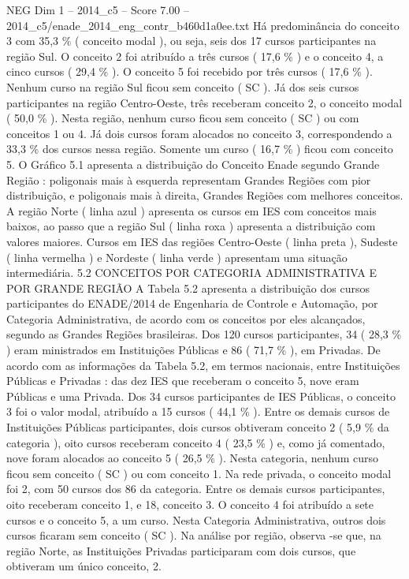 \begin{textsample}{NEG Dim 1 – 2014\_c5 – Score 7.00 – 2014\_c5/enade\_2014\_eng\_contr\_b460d1a0ee.txt}
Há predominância do conceito 3 com 35,3 \% ( conceito modal ), ou seja, seis dos 17 cursos participantes na região Sul.
O conceito 2 foi atribuído a três cursos ( 17,6 \% ) e o conceito 4, a cinco cursos ( 29,4 \% ).
O conceito 5 foi recebido por três cursos ( 17,6 \% ).
Nenhum curso na região Sul ficou sem conceito ( SC ).
Já dos seis cursos participantes na região Centro-Oeste, três receberam conceito 2, o conceito modal ( 50,0 \% ).
Nesta região, nenhum curso ficou sem conceito ( SC ) ou com conceitos 1 ou 4.
Já dois cursos foram alocados no conceito 3, correspondendo a 33,3 \% dos cursos nessa região.
Somente um curso ( 16,7 \% ) ficou com conceito 5.
O Gráfico 5.1 apresenta a distribuição do Conceito Enade segundo Grande Região : poligonais mais à esquerda representam Grandes Regiões com pior distribuição, e poligonais mais à direita, Grandes Regiões com melhores conceitos.
A região Norte ( linha azul ) apresenta os cursos em IES com conceitos mais baixos, ao passo que a região Sul ( linha roxa ) apresenta a distribuição com valores maiores.
Cursos em IES das regiões Centro-Oeste ( linha preta ), Sudeste ( linha vermelha ) e Nordeste ( linha verde ) apresentam uma situação intermediária. 5.2 CONCEITOS POR CATEGORIA ADMINISTRATIVA E POR GRANDE REGIÃO A Tabela 5.2 apresenta a distribuição dos cursos participantes do ENADE/2014 de Engenharia de Controle e Automação, por Categoria Administrativa, de acordo com os conceitos por eles alcançados, segundo as Grandes Regiões brasileiras.
Dos 120 cursos participantes, 34 ( 28,3 \% ) eram ministrados em Instituições Públicas e 86 ( 71,7 \% ), em Privadas.
De acordo com as informações da Tabela 5.2, em termos nacionais, entre Instituições Públicas e Privadas : das dez IES que receberam o conceito 5, nove eram Públicas e uma Privada.
Dos 34 cursos participantes de IES Públicas, o conceito 3 foi o valor modal, atribuído a 15 cursos ( 44,1 \% ).
Entre os demais cursos de Instituições Públicas participantes, dois cursos obtiveram conceito 2 ( 5,9 \% da categoria ), oito cursos receberam conceito 4 ( 23,5 \% ) e, como já comentado, nove foram alocados ao conceito 5 ( 26,5 \% ).
Nesta categoria, nenhum curso ficou sem conceito ( SC ) ou com conceito 1.
Na rede privada, o conceito modal foi 2, com 50 cursos dos 86 da categoria.
Entre os demais cursos participantes, oito receberam conceito 1, e 18, conceito 3.
O conceito 4 foi atribuído a sete cursos e o conceito 5, a um curso.
Nesta Categoria Administrativa, outros dois cursos ficaram sem conceito ( SC ).
Na análise por região, observa -se que, na região Norte, as Instituições Privadas participaram com dois cursos, que obtiveram um único conceito, 2.

\end{textsample}
